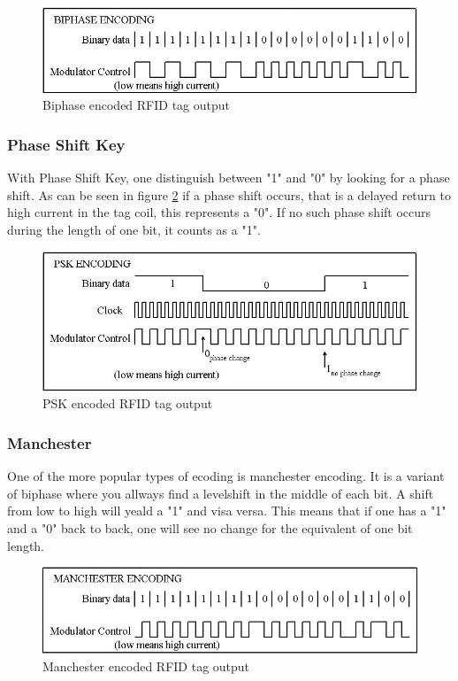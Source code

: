 \begin{figure}[H]
    \centering
    \includegraphics[width=\textwidth]{03_Theory/figures/BIPHASE.png}
    \caption{Biphase encoded RFID tag output}
    \label{fig:03:biphase}
\end{figure}

\subsubsection{Phase Shift Key}
With Phase Shift Key, one distinguish between "1" and "0" by looking for a phase shift. As can be seen in figure \ref{fig:03:PSK} if a phase shift occurs, that is a delayed return to high current in the tag coil, this represents a "0". If no such phase shift occurs during the length of one bit, it counts as a "1".
\begin{figure}[H]
    \centering
    \includegraphics[width=\textwidth]{03_Theory/figures/PSK.png}
    \caption{PSK encoded RFID tag output}
    \label{fig:03:PSK}
\end{figure}

\newpage
\subsubsection{Manchester}
One of the more popular types of ecoding is manchester encoding. It is a variant of biphase where you allways find a levelshift in the middle of each bit. A shift from low to high will yeald a "1" and visa versa. This means that if one has a "1" and a "0" back to back, one will see no change for the equivalent of one bit length. \cite{ManchesterAtmel,forster2000manchester,Manchester}
\begin{figure}[H]
    \centering
    \includegraphics[width=\textwidth]{03_Theory/figures/Manchester.png}
    \caption{Manchester encoded RFID tag output}
    \label{fig:03:Manchester}
\end{figure}

